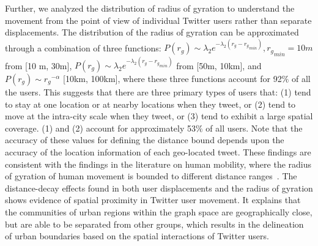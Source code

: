 \documentclass[]{tGIS2e}
\begin{document}
Further, we analyzed the distribution of radius of gyration to understand the movement from the point of view of individual Twitter users rather than separate displacements.
The distribution of the radius of gyration can be approximated through a combination of three functions: $P(r_{g}) \sim \lambda_{2} e^{-\lambda_{2}(r_{g} - {r_{g}}_{min})}, {r_{g}}_{min}=10m$ from [10 m, 30m], $P(r_{g}) \sim \lambda_{2} e^{-\lambda_{2}(r_{g} - {r_{g}}_{min})}$ from [50m, 10km], and $P(r_{g}) \sim {r_{g}}^{-\alpha}$ [10km, 100km], where these three functions account for 92$\%$ of all the users.
This suggests that there are three primary types of users that: (1) tend to stay at one location or at nearby locations when they tweet, or (2) tend to move at the intra-city scale when they tweet, or (3)  tend to exhibit a large spatial coverage. 
(1) and (2) account for approximately 53$\%$ of all users.  
Note that the accuracy of these values for defining the distance bound depends upon the accuracy of the location information of each geo-located tweet. 
These findings are consistent with the findings in the literature on human mobility, where the radius of gyration of human movement is bounded to different distance ranges~\citep{brockmann2006,gonzalez2008}.
The distance-decay effects found in both user displacements and the radius of gyration shows evidence of spatial proximity in Twitter user movement. 
It explains that the communities of urban regions within the graph space are geographically close, but are able to be separated from other groups, which results in the delineation of urban boundaries based on the spatial interactions of Twitter users.
\end{document}
